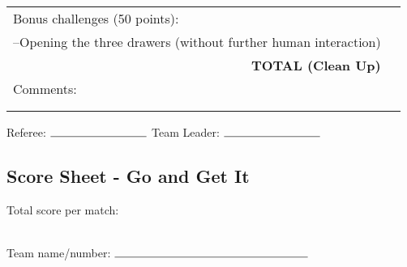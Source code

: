 \documentclass{article}
\begin{document}
\begin{center}
\begin{tabular}{|m{0.4cm}|m{0.8cm}|m{1cm}|m{1cm}|m{1.2cm}|m{0.8cm}|m{0.8cm}|m{1cm}|m{0.8cm}|m{0.8cm}|}
    \multicolumn{9}{|l|}{Bonus challenges (50 points):} &\\
    \multicolumn{9}{|l|}{--Opening the three drawers (without further human interaction)} &\\
    \hline
    \multicolumn{9}{|r|}{\textbf{TOTAL (Clean Up)}  } &\\ 
    \hline
    \multicolumn{10}{|l|}{Comments:} \\ 
    \multicolumn{10}{|l|}{} \\
    \multicolumn{10}{|l|}{} \\
    \hline
\end{tabular}
\end{center}

\begin{center} Referee: $\rule{3cm}{0.15mm}$ Team Leader: $\rule{3cm}{0.15mm}$ \end{center}

\clearpage

\subsection{Score Sheet - Go and Get It}

Total score per match:\\ \\

\begin{center} Team name/number: $\rule{6cm}{0.15mm}$ \end{center}
\end{document}
